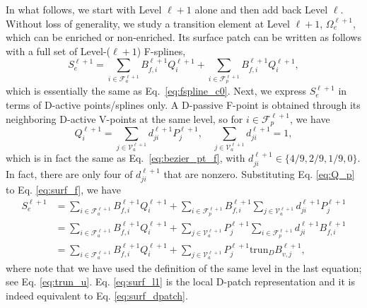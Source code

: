 \documentclass[graybox]{svmult}
\begin{document}
In what follows, we start with Level $\ell+1$ alone and then add back Level $\ell$. Without loss of generality, we study a transition element at Level $\ell+1$, $\Omega_e^{\ell+1}$, which can be enriched or non-enriched. Its surface patch can be written as follows with a full set of Level-($\ell+1$) F-splines,
\begin{equation}
S_e^{\ell+1} = \sum_{i\in \mathcal{F}_a^{\ell+1}} B_{f\!,i}^{\ell+1} Q_i^{\ell+1} + \sum_{i\in \mathcal{F}_p^{\ell+1}} B_{f\!,i}^{\ell+1} Q_i^{\ell+1},
\label{eq:surf_f}
\end{equation}
which is essentially the same as Eq.~\eqref{eq:fspline_c0}. Next, we express $S_e^{\ell+1}$ in terms of D-active points/splines only.
A D-passive F-point is obtained through its neighboring D-active V-points at the same level, so for $i\in\mathcal{F}_p^{\ell+1}$, we have
\begin{equation}
Q_i^{\ell+1} = \sum_{j\in\mathcal{V}_a^{\ell+1}} d_{ji}^{\ell+1} P_j^{\ell+1}, \quad \sum_{j\in\mathcal{V}_a^{\ell+1}} d_{ji}^{\ell+1} = 1,
\label{eq:Q_p}
\end{equation}
which is in fact the same as Eq.~\eqref{eq:bezier_pt_f}, with $d_{ji}^{\ell+1}\in\{4/9,2/9,1/9,0\}$. In fact, there are only four of $d_{ji}^{\ell+1}$ that are nonzero. Substituting Eq. \eqref{eq:Q_p} to Eq. \eqref{eq:surf_f}, we have
\begin{equation}
\begin{aligned}
S_e^{\ell+1} &= \sum_{i\in \mathcal{F}_a^{\ell+1}} B_{f\!,i}^{\ell+1} Q_i^{\ell+1}  + \sum_{i\in \mathcal{F}_p^{\ell+1}} B_{f\!,i}^{\ell+1} \sum_{j\in\mathcal{V}_a^{\ell+1}} d_{ji}^{\ell+1} P_j^{\ell+1} \\
&=\sum_{i\in \mathcal{F}_a^{\ell+1}} B_{f\!,i}^{\ell+1} Q_i^{\ell+1}  + \sum_{j\in\mathcal{V}_a^{\ell+1}} P_j^{\ell+1} \sum_{i\in \mathcal{F}_p^{\ell+1}} d_{ji}^{\ell+1}  B_{f\!,i}^{\ell+1} \\
&=\sum_{i\in \mathcal{F}_a^{\ell+1}} B_{f\!,i}^{\ell+1} Q_i^{\ell+1}  + \sum_{j\in\mathcal{V}_a^{\ell+1}} P_j^{\ell+1} \mathrm{trun}_D B_{v,j}^{\ell+1},
\end{aligned}
\label{eq:surf_l1}
\end{equation}
where note that we have used the definition of the same level in the last equation; see Eq. \eqref{eq:trun_u}. Eq. \eqref{eq:surf_l1} is the local D-patch representation and it is indeed equivalent to Eq. \eqref{eq:surf_dpatch}.
\end{document}
